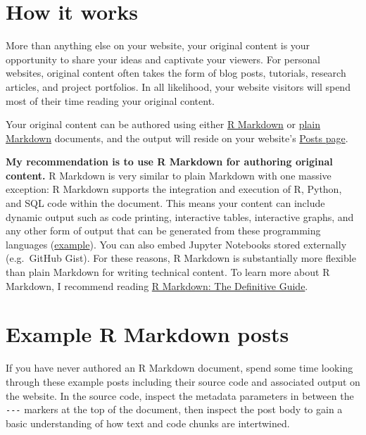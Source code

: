 \documentclass[
]{book}
\begin{document}
\hypertarget{how-it-works-3}{%
\section{How it works}\label{how-it-works-3}}

More than anything else on your website, your original content is your opportunity to share your ideas and captivate your viewers. For personal websites, original content often takes the form of blog posts, tutorials, research articles, and project portfolios. In all likelihood, your website visitors will spend most of their time reading your original content.

Your original content can be authored using either \href{https://bookdown.org/yihui/rmarkdown/html-document.html}{R Markdown} or \href{https://www.markdownguide.org/getting-started/}{plain Markdown} documents, and the output will reside on your website's \href{https://r4sites-anatole-custom.netlify.app/post/}{Posts page}.

\textbf{My recommendation is to use R Markdown for authoring original content.} R Markdown is very similar to plain Markdown with one massive exception: R Markdown supports the integration and execution of R, Python, and SQL code within the document. This means your content can include dynamic output such as code printing, interactive tables, interactive graphs, and any other form of output that can be generated from these programming languages (\href{https://abndistro.com/post/2020/07/12/time-series-forecasting-as-a-supervised-machine-learning-problem/}{example}). You can also embed Jupyter Notebooks stored externally (e.g.~GitHub Gist). For these reasons, R Markdown is substantially more flexible than plain Markdown for writing technical content. To learn more about R Markdown, I recommend reading \href{https://bookdown.org/yihui/rmarkdown/}{R Markdown: The Definitive Guide}.

\hypertarget{example-r-markdown-posts}{%
\section{Example R Markdown posts}\label{example-r-markdown-posts}}

If you have never authored an R Markdown document, spend some time looking through these example posts including their source code and associated output on the website. In the source code, inspect the metadata parameters in between the \texttt{-\/-\/-} markers at the top of the document, then inspect the post body to gain a basic understanding of how text and code chunks are intertwined.
\end{document}
